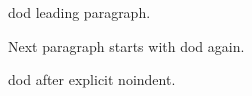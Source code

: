 \documentclass{article}
\begin{document}
\frenchspacing
\gls{dod} leading paragraph.

Next paragraph starts with \gls{dod} again.

\par
\noindent\gls{dod} after explicit noindent.
\end{document}
